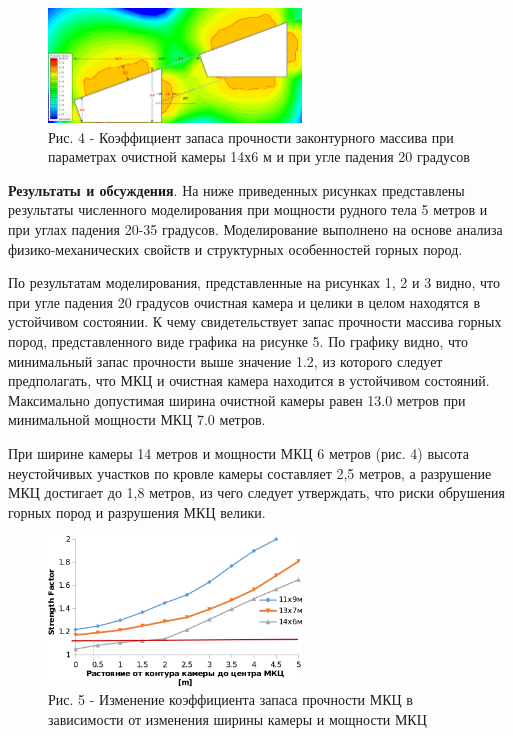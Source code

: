 \begin{figure}[H]
	\centering
	\includegraphics[width=0.6\textwidth]{assets/285}
    \caption*{Рис. 4 - Коэффициент запаса прочности законтурного массива при параметрах очистной камеры 14х6 м и при угле падения 20 градусов}
\end{figure}

\begin{multicols}{2}
{\bfseries Результаты и обсуждения}. На ниже приведенных рисунках
представлены результаты численного моделирования при мощности рудного
тела 5 метров и при углах падения 20-35 градусов. Моделирование
выполнено на основе анализа физико-механических свойств и структурных
особенностей горных пород.

По результатам моделирования, представленные на рисунках 1, 2 и 3 видно,
что при угле падения 20 градусов очистная камера и целики в целом
находятся в устойчивом состоянии. К чему свидетельствует запас прочности
массива горных пород, представленного виде графика на рисунке 5. По
графику видно, что минимальный запас прочности выше значение 1.2, из
которого следует предполагать, что МКЦ и очистная камера находится в
устойчивом состояний. Максимально допустимая ширина очистной камеры
равен 13.0 метров при минимальной мощности МКЦ 7.0 метров.

При ширине камеры 14 метров и мощности МКЦ 6 метров (рис. 4) высота
неустойчивых участков по кровле камеры составляет 2,5 метров, а
разрушение МКЦ достигает до 1,8 метров, из чего следует утверждать, что
риски обрушения горных пород и разрушения МКЦ велики.
\end{multicols}

\begin{figure}[H]
	\centering
	\includegraphics[width=0.6\textwidth]{assets/285.1}
    \caption*{Рис. 5 - Изменение коэффициента запаса прочности МКЦ в зависимости от изменения ширины камеры и мощности МКЦ}
\end{figure}

